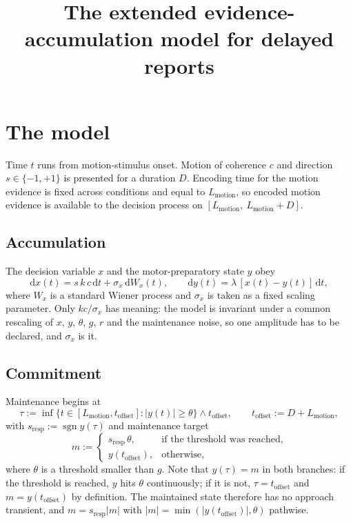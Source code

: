 \documentclass[a4paper,11pt]{article}
\title{The extended evidence-accumulation model for delayed reports}
\date{}
\newcommand{\dd}{\mathrm d}
\newcommand{\1}{\mathbbm{1}}
\DeclareMathOperator{\sgn}{sgn}
\newcommand{\Lmot}{L_{\mathrm{motion}}}
\newcommand{\toff}{t_{\mathrm{offset}}}
\newcommand{\sresp}{s_{\mathrm{resp}}}
\begin{document}
\maketitle


\tableofcontents

\section{The model}
\label{sec:model}

Time $t$ runs from motion-stimulus onset. Motion of coherence $c$ and direction
$s\in\{-1,+1\}$ is presented for a duration $D$. Encoding time for the motion evidence is
fixed across conditions and equal to $\Lmot$, so encoded motion evidence is available to
the decision process on $[\Lmot,\ \Lmot+D]$.

\subsection{Accumulation}

The decision variable $x$ and the motor-preparatory state $y$ obey
\begin{equation}
\dd x(t)=s\,k\,c\,\dd t+\sigma_x\,\dd W_x(t),
\qquad
\dd y(t)=\lambda\,[x(t)-y(t)]\,\dd t ,
\label{eq:acc}
\end{equation}
where $W_x$ is a standard Wiener process and $\sigma_x$ is taken as a fixed scaling
parameter. Only $kc/\sigma_x$ has meaning: the model is invariant under a common
rescaling of $x$, $y$, $\theta$, $g$, $r$ and the maintenance noise, so one amplitude has
to be declared, and $\sigma_x$ is it.

\subsection{Commitment}

Maintenance begins at
\begin{equation}
\tau:=\inf\{t\in[\Lmot,\toff]:|y(t)|\ge\theta\}\wedge\toff,
\qquad \toff:=D+\Lmot,
\end{equation}
with $\sresp:=\sgn y(\tau)$ and maintenance target
\begin{equation}
m:=\begin{cases}\sresp\,\theta,&\text{if the threshold was reached},\\
y(\toff),&\text{otherwise,}\end{cases}
\label{eq:m}
\end{equation}
where $\theta$ is a threshold smaller than $g$. Note that $y(\tau)=m$ in both branches:
if the threshold is reached, $y$ hits $\theta$ continuously; if it is not, $\tau=\toff$
and $m=y(\toff)$ by definition. The maintained state therefore has no approach transient,
and $m=\sresp|m|$ with $|m|=\min(|y(\toff)|,\theta)$ pathwise.
\end{document}
